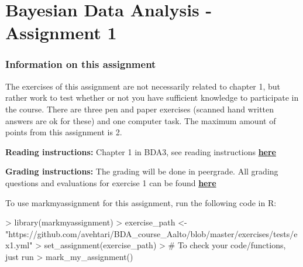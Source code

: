 \documentclass[11pt,a4paper,english]{article}
\newcommand{\HRule}{\rule{\linewidth}{0.5mm}}
\begin{document}


\section*{Bayesian Data Analysis - Assignment 1}





\newpage

\subsubsection*{Information on this assignment}

The exercises of this assignment are not necessarily related to chapter 1, but rather work to test whether or not you have sufficient knowledge to participate in the course. There are three pen and paper exercises (scanned hand written answers are ok for these) and one computer task. The maximum amount of points from this assignment is 2. 

\textbf{Reading instructions:} Chapter 1 in BDA3, see reading instructions \href{https://github.com/avehtari/BDA_course_Aalto/blob/master/chapter_notes/BDA_notes_ch1.pdf}{\textbf{here}}

\textbf{Grading instructions:} The grading will be done in peergrade. All grading questions and evaluations for exercise 1 can be found \href{https://github.com/avehtari/BDA_course_Aalto/blob/master/exercises/ex1_rubric.md}{\textbf{here}}

To use markmyassignment for this assignment, run the following code in R:
\begin{Schunk}
\begin{Sinput}
> library(markmyassignment)
> exercise_path <- 
    "https://github.com/avehtari/BDA_course_Aalto/blob/master/exercises/tests/ex1.yml"
> set_assignment(exercise_path)
> # To check your code/functions, just run
> mark_my_assignment()
\end{Sinput}
\end{Schunk}


\end{document}

